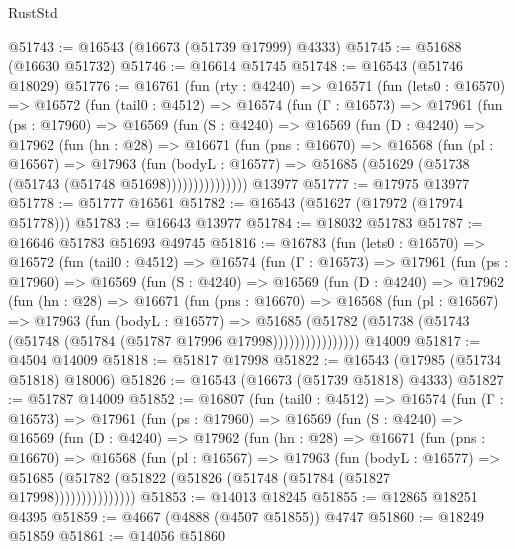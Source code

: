 \begin{lexlean}{RustStd}
\begin{coremodule}
@51743 := @16543 (@16673 (@51739 @17999) @4333)
@51745 := @51688 (@16630 @51732)
@51746 := @16614 @51745
@51748 := @16543 (@51746 @18029)
@51776 := @16761
    (fun (rty : @4240) =>
    @16571
      (fun (lets0 : @16570) =>
      @16572
        (fun (tail0 : @4512) =>
        @16574
          (fun (Γ : @16573) =>
          @17961
            (fun (ps : @17960) =>
            @16569
              (fun (S : @4240) =>
              @16569
                (fun (D : @4240) =>
                @17962
                  (fun (hn : @28) =>
                  @16671
                    (fun (pns : @16670) =>
                    @16568
                      (fun (pl : @16567) =>
                      @17963
                        (fun (bodyL : @16577) =>
                        @51685 (@51629 (@51738 (@51743 (@51748 @51698)))))))))))))))
    @13977
@51777 := @17975 @13977
@51778 := @51777 @16561
@51782 := @16543 (@51627 (@17972 (@17974 @51778)))
@51783 := @16643 @13977
@51784 := @18032 @51783
@51787 := @16646 @51783 @51693 @49745
@51816 := @16783
    (fun (lets0 : @16570) =>
    @16572
      (fun (tail0 : @4512) =>
      @16574
        (fun (Γ : @16573) =>
        @17961
          (fun (ps : @17960) =>
          @16569
            (fun (S : @4240) =>
            @16569
              (fun (D : @4240) =>
              @17962
                (fun (hn : @28) =>
                @16671
                  (fun (pns : @16670) =>
                  @16568
                    (fun (pl : @16567) =>
                    @17963
                      (fun (bodyL : @16577) =>
                      @51685
                        (@51782
                          (@51738 (@51743 (@51748 (@51784 (@51787 @17996 @17998))))))))))))))))
    @14009
@51817 := @4504 @14009
@51818 := @51817 @17998
@51822 := @16543 (@17985 (@51734 @51818) @18006)
@51826 := @16543 (@16673 (@51739 @51818) @4333)
@51827 := @51787 @14009
@51852 := @16807
    (fun (tail0 : @4512) =>
    @16574
      (fun (Γ : @16573) =>
      @17961
        (fun (ps : @17960) =>
        @16569
          (fun (S : @4240) =>
          @16569
            (fun (D : @4240) =>
            @17962
              (fun (hn : @28) =>
              @16671
                (fun (pns : @16670) =>
                @16568
                  (fun (pl : @16567) =>
                  @17963
                    (fun (bodyL : @16577) =>
                    @51685 (@51782 (@51822 (@51826 (@51748 (@51784 (@51827 @17998)))))))))))))))
@51853 := @14013 @18245
@51855 := @12865 @18251 @4395
@51859 := @4667 (@4888 (@4507 @51855)) @4747
@51860 := @18249 @51859
@51861 := @14056 @51860

\end{coremodule}
\end{lexlean}

